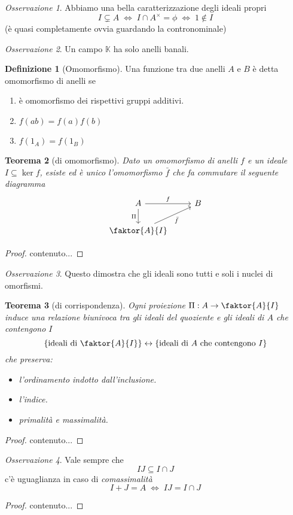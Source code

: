 \documentclass[a4paper]{article}
\newtheorem{theorem}{Teorema}[section]
\theoremstyle{remark}
\newtheorem*{remark}{Osservazione}
\theoremstyle{definition}
\newtheorem{definition}[theorem]{Definizione}
\begin{document}
\begin{multicols}{2}
\begin{remark}
	Abbiamo una bella caratterizzazione degli ideali propri
	\[ I \subsetneq A \;\Leftrightarrow\; I \cap A^\times = \phi \;\Leftrightarrow\; 1 \notin I \]
	(è quasi completamente ovvia guardando la contronominale)
\end{remark}


\begin{remark}
	Un campo $ \mathbb{K} $ ha solo anelli banali.
\end{remark}

\begin{definition}[Omomorfismo]
	Una funzione tra due anelli $ A $ e $ B $ è detta omomorfismo di anelli se
	\begin{enumerate}
		\item è omomorfismo dei rispettivi gruppi additivi.
		\item $ f(ab)=f(a)f(b) $
		\item $ f(1_A)=f(1_B) $
	\end{enumerate}
\end{definition}

\begin{theorem}[di omomorfismo]\label{omoanelli}
	Dato un omomorfismo di anelli $ f $ e un ideale $ I \subseteq \ker f $, esiste ed è unico l'omomorfismo $ \bar{f} $ che fa commutare il seguente diagramma
	\[ \begin{tikzcd}
	A \arrow{r}{f} \arrow[swap]{d}{\Pi} & B \\
	\faktor{A}{I} \arrow[swap]{ru}{\bar{f}}
	\end{tikzcd} \]
\end{theorem}
\begin{proof}
	contenuto...
\end{proof}
\begin{remark}
	Questo dimostra che gli ideali sono tutti e soli i nuclei di omorfismi.
\end{remark}

\begin{theorem}[di corrispondenza]\label{corr}
	Ogni proiezione $ \Pi : A \to \faktor{A}{I} $ induce una relazione biunivoca tra gli ideali del quoziente e gli ideali di $ A $ che contengono $ I $
	\[ \{ \text{ideali di }\faktor{A}{I} \} \leftrightarrow \{ \text{ideali di $ A $ che contengono $ I $} \} \]
	che preserva:
	\begin{itemize}
		\item l'ordinamento indotto dall'inclusione.
		\item l'indice.
		\item primalità e massimalità.
	\end{itemize}
\end{theorem}
\begin{proof}
	contenuto...
\end{proof}
\begin{remark}
	Vale sempre che
	\[ IJ \subseteq I \cap J \]
	c'è uguaglianza in caso di \emph{comassimalità}
	\[ I + J = A \;\Leftrightarrow\; IJ = I \cap J \]
\end{remark}
\begin{proof}
	contenuto...
\end{proof}


\end{multicols}
\end{document}
